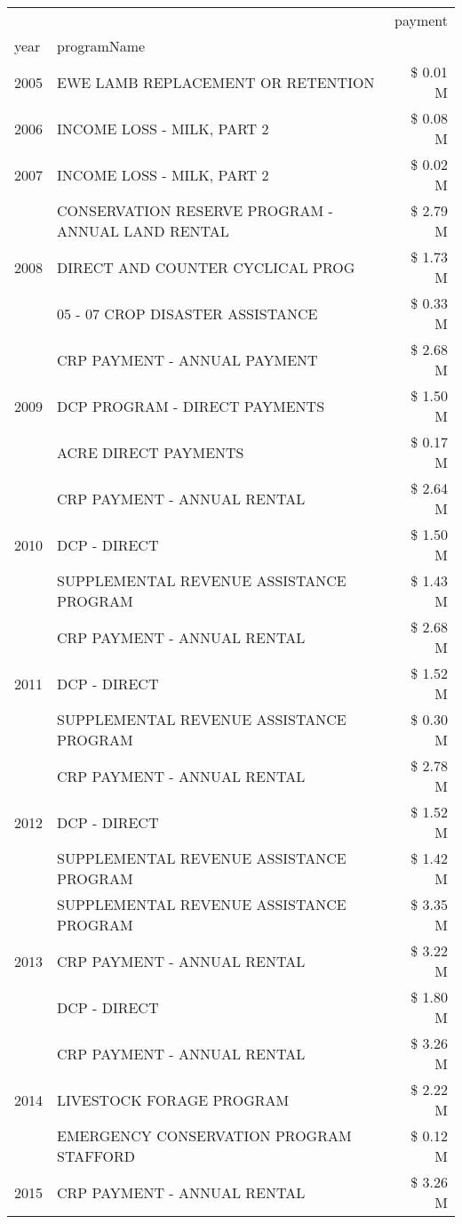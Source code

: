 \begin{tabular}{llr}
\toprule
 &  & payment \\
year & programName &  \\
\midrule
2005 & EWE LAMB REPLACEMENT OR RETENTION & \$ 0.01 M \\
\cline{1-3}
2006 & INCOME LOSS - MILK, PART 2 & \$ 0.08 M \\
\cline{1-3}
2007 & INCOME LOSS - MILK, PART 2 & \$ 0.02 M \\
\cline{1-3}
\multirow[t]{3}{*}{2008} & CONSERVATION RESERVE PROGRAM - ANNUAL LAND RENTAL & \$ 2.79 M \\
 & DIRECT AND COUNTER CYCLICAL PROG & \$ 1.73 M \\
 & 05 - 07 CROP DISASTER ASSISTANCE & \$ 0.33 M \\
\cline{1-3}
\multirow[t]{3}{*}{2009} & CRP PAYMENT - ANNUAL PAYMENT & \$ 2.68 M \\
 & DCP PROGRAM - DIRECT PAYMENTS & \$ 1.50 M \\
 & ACRE DIRECT PAYMENTS & \$ 0.17 M \\
\cline{1-3}
\multirow[t]{3}{*}{2010} & CRP PAYMENT - ANNUAL RENTAL & \$ 2.64 M \\
 & DCP - DIRECT & \$ 1.50 M \\
 & SUPPLEMENTAL REVENUE ASSISTANCE PROGRAM & \$ 1.43 M \\
\cline{1-3}
\multirow[t]{3}{*}{2011} & CRP PAYMENT - ANNUAL RENTAL & \$ 2.68 M \\
 & DCP - DIRECT & \$ 1.52 M \\
 & SUPPLEMENTAL REVENUE ASSISTANCE PROGRAM & \$ 0.30 M \\
\cline{1-3}
\multirow[t]{3}{*}{2012} & CRP PAYMENT - ANNUAL RENTAL & \$ 2.78 M \\
 & DCP - DIRECT & \$ 1.52 M \\
 & SUPPLEMENTAL REVENUE ASSISTANCE PROGRAM & \$ 1.42 M \\
\cline{1-3}
\multirow[t]{3}{*}{2013} & SUPPLEMENTAL REVENUE ASSISTANCE PROGRAM & \$ 3.35 M \\
 & CRP PAYMENT - ANNUAL RENTAL & \$ 3.22 M \\
 & DCP - DIRECT & \$ 1.80 M \\
\cline{1-3}
\multirow[t]{3}{*}{2014} & CRP PAYMENT - ANNUAL RENTAL & \$ 3.26 M \\
 & LIVESTOCK FORAGE PROGRAM & \$ 2.22 M \\
 & EMERGENCY CONSERVATION PROGRAM STAFFORD & \$ 0.12 M \\
\cline{1-3}
\multirow[t]{3}{*}{2015} & CRP PAYMENT - ANNUAL RENTAL & \$ 3.26 M \\

\end{tabular}
